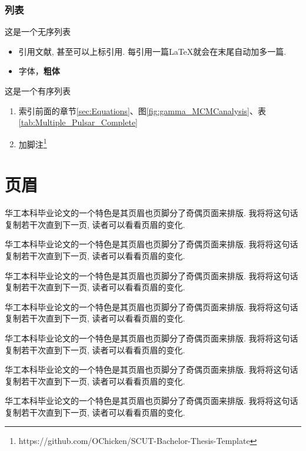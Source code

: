 \documentclass[a4paper]{article}
\begin{document}
\subsubsection{列表}
\label{sec:font_list_etc:list}
这是一个无序列表
\begin{itemize}
\item 引用文献\cite{long2015fully}, 甚至可以上标引用. 每引用一篇\LaTeX 就会在末尾自动加多一篇.
\item 字体{\color{red}{变红}}，\textbf{粗体}
\end{itemize}

这是一个有序列表
\begin{enumerate}
\item 索引前面的章节\ref{sec:Equations}、图\ref{fig:gamma_MCMCanalysis}、表\ref{tab:Multiple_Pulsar_Complete}
\item 加脚注\footnote{https://github.com/OChicken/SCUT-Bachelor-Thesis-Template}
\end{enumerate}

\pagebreak[4]

\section{页眉}
华工本科毕业论文的一个特色是其页眉也页脚分了奇偶页面来排版. 我将将这句话复制若干次直到下一页, 读者可以看看页眉的变化.

华工本科毕业论文的一个特色是其页眉也页脚分了奇偶页面来排版. 我将将这句话复制若干次直到下一页, 读者可以看看页眉的变化.

华工本科毕业论文的一个特色是其页眉也页脚分了奇偶页面来排版. 我将将这句话复制若干次直到下一页, 读者可以看看页眉的变化.

华工本科毕业论文的一个特色是其页眉也页脚分了奇偶页面来排版. 我将将这句话复制若干次直到下一页, 读者可以看看页眉的变化.

华工本科毕业论文的一个特色是其页眉也页脚分了奇偶页面来排版. 我将将这句话复制若干次直到下一页, 读者可以看看页眉的变化.

华工本科毕业论文的一个特色是其页眉也页脚分了奇偶页面来排版. 我将将这句话复制若干次直到下一页, 读者可以看看页眉的变化.

华工本科毕业论文的一个特色是其页眉也页脚分了奇偶页面来排版. 我将将这句话复制若干次直到下一页, 读者可以看看页眉的变化.
\end{document}
